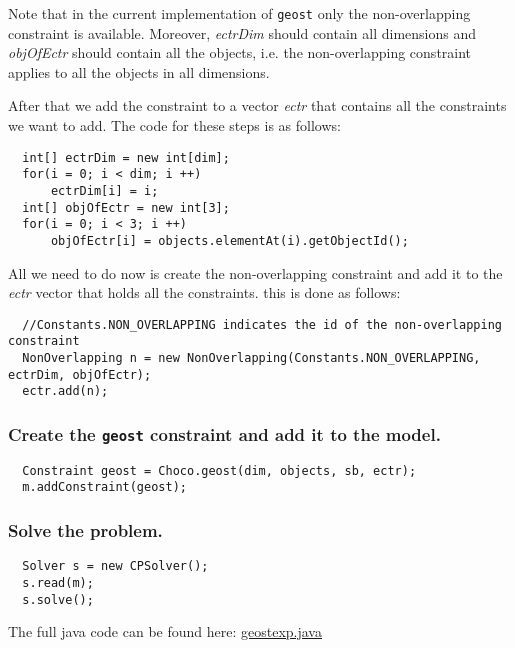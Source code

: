 \begin{note}
Note that in the current implementation of \texttt{geost} only the non-overlapping constraint is available. Moreover, 
\emph{ectrDim} should contain all dimensions and \emph{objOfEctr} should contain all the objects, i.e. the non-overlapping constraint applies to all the objects in all dimensions.
\end{note}
 
After that we add the constraint to a vector \emph{ectr} that contains all the constraints we want to add.
The code for these steps is as follows: 
\begin{lstlisting}
  int[] ectrDim = new int[dim]; 
  for(i = 0; i < dim; i ++)  
      ectrDim[i] = i; 
  int[] objOfEctr = new int[3]; 
  for(i = 0; i < 3; i ++) 
      objOfEctr[i] = objects.elementAt(i).getObjectId();
\end{lstlisting}
All we need to do now is create the non-overlapping constraint and add it to the \emph{ectr} vector
that holds all the constraints. this is done as follows:
\begin{lstlisting}
  //Constants.NON_OVERLAPPING indicates the id of the non-overlapping constraint
  NonOverlapping n = new NonOverlapping(Constants.NON_OVERLAPPING, ectrDim, objOfEctr);
  ectr.add(n);
\end{lstlisting}

\subsubsection{Create the \texttt{geost} constraint and add it to the model.}\label{geostdescription:createthegeostconstraintandaddittothemodel}\hypertarget{geostdescription:createthegeostconstraintandaddittothemodel}{}
\begin{lstlisting}
  Constraint geost = Choco.geost(dim, objects, sb, ectr);
  m.addConstraint(geost);
\end{lstlisting}
	
\subsubsection{Solve the problem.}\label{geostdescription:solvetheproblem}\hypertarget{geostdescription:solvetheproblem}{}
\begin{lstlisting}
  Solver s = new CPSolver();
  s.read(m);
  s.solve();
\end{lstlisting}

The full java code can be found here: \href{media/zip/geostexp.java}{geostexp.java}

